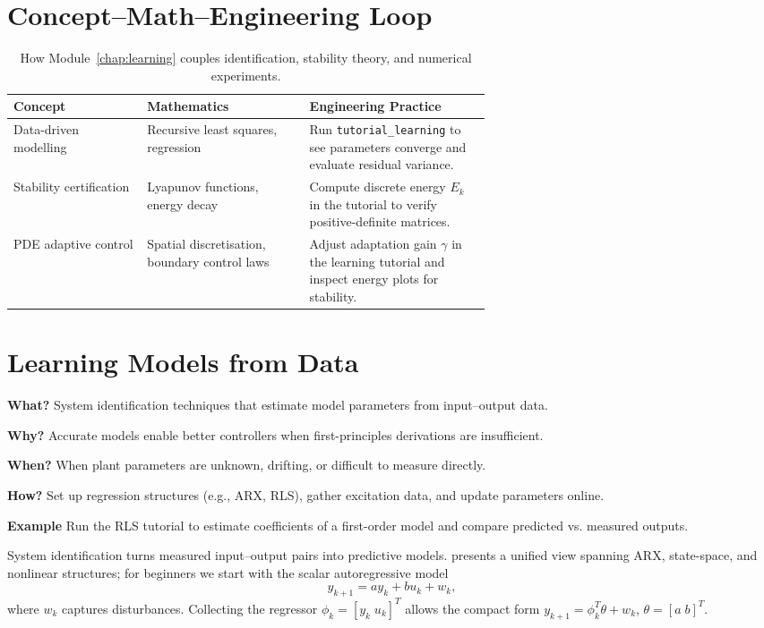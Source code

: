 \section{Concept--Math--Engineering Loop}
\begin{table}[h]
    \centering
    \small
    \renewcommand{\arraystretch}{1.2}
    \begin{tabularx}{\linewidth}{|>{\raggedright\arraybackslash}p{0.28\linewidth}|>{\raggedright\arraybackslash}p{0.34\linewidth}|>{\raggedright\arraybackslash}X|}
        \hline
        \textbf{Concept} & \textbf{Mathematics} & \textbf{Engineering Practice} \\
        \hline
        Data-driven modelling & Recursive least squares, regression & Run \texttt{tutorial\_learning} to see parameters converge and evaluate residual variance. \\
        \hline
        Stability certification & Lyapunov functions, energy decay & Compute discrete energy $E_k$ in the tutorial to verify positive-definite matrices. \\
        \hline
        PDE adaptive control & Spatial discretisation, boundary control laws & Adjust adaptation gain $\gamma$ in the learning tutorial and inspect energy plots for stability. \\
        \hline
    \end{tabularx}
    \caption{How Module~\ref{chap:learning} couples identification, stability theory, and numerical experiments.}
\end{table}

\section{Learning Models from Data}
\begin{beginnerguide}
    \item[\textbf{What?}] System identification techniques that estimate model parameters from input--output data.
    \item[\textbf{Why?}] Accurate models enable better controllers when first-principles derivations are insufficient.
    \item[\textbf{When?}] When plant parameters are unknown, drifting, or difficult to measure directly.
    \item[\textbf{How?}] Set up regression structures (e.g., ARX, RLS), gather excitation data, and update parameters online.
    \item[\textbf{Example}] Run the RLS tutorial to estimate coefficients of a first-order model and compare predicted vs. measured outputs.
\end{beginnerguide}
System identification turns measured input--output pairs into predictive models. \textcite{ljung2012control} presents a unified view spanning ARX, state-space, and nonlinear structures; for beginners we start with the scalar autoregressive model
\begin{equation}
    y_{k+1} = a y_k + b u_k + w_k,
\end{equation}
where $w_k$ captures disturbances. Collecting the regressor $\phi_k = [y_k\; u_k]^T$ allows the compact form $y_{k+1} = \phi_k^T \theta + w_k$, $\theta = [a\; b]^T$.

